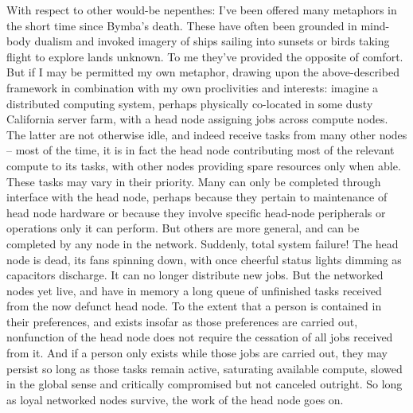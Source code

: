 \documentclass[twoside,10pt]{article}
\begin{document}
\begin{article*}
With respect to other would-be nepenthes: I’ve been offered many metaphors in the short time since Bymba’s death. These have often been grounded in mind-body dualism and invoked imagery of ships sailing into sunsets or birds taking flight to explore lands unknown. To me they’ve provided the opposite of comfort. But if I may be permitted my own metaphor, drawing upon the above-described framework in combination with my own proclivities and interests: imagine a distributed computing system, perhaps physically co-located in some dusty California server farm, with a head node assigning jobs across compute nodes. The latter are not otherwise idle, and indeed receive tasks from many other nodes – most of the time, it is in fact the head node contributing most of the relevant compute to its tasks, with other nodes providing spare resources only when able. These tasks may vary in their priority. Many can only be completed through interface with the head node, perhaps because they pertain to maintenance of head node hardware or because they involve specific head-node peripherals or operations only it can perform. But others are more general, and can be completed by any node in the network. Suddenly, total system failure! The head node is dead, its fans spinning down, with once cheerful status lights dimming as capacitors discharge. It can no longer distribute new jobs. But the networked nodes yet live, and have in memory a long queue of unfinished tasks received from the now defunct head node. To the extent that a person is contained in their preferences, and exists insofar as those preferences are carried out, nonfunction of the head node does not require the cessation of all jobs received from it. And if a person only exists while those jobs are carried out, they may persist so long as those tasks remain active, saturating available compute, slowed in the global sense and critically compromised but not canceled outright. So long as loyal networked nodes survive, the work of the head node goes on.
\\


\end{article*}
\end{document}
